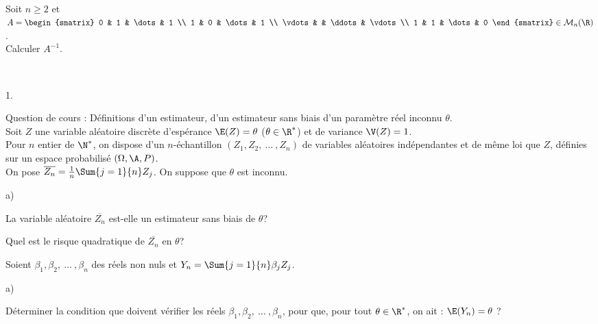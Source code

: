 \documentclass[11pt]{article}%
\begin{document}
\begin{exerciceSP}~\\
  Soit $n \geq 2$ et $A = 
  \begin{smatrix} 
    0 & 1 & \dots & 1 \\ 
    1 & 0 & \dots & 1 \\ 
    \vdots & & \ddots & \vdots \\ 
    1 & 1 & \dots & 0
  \end{smatrix} \in \mathcal{M}_n(\R)$.
  \\[.2cm]
  Calculer $A^{-1}$.
\end{exerciceSP}


\newpage


\begin{exerciceAP}~
  \begin{noliste}{1.}
    \setlength{\itemsep}{2mm}
  \item Question de cours : Définitions d'un estimateur, d'un
    estimateur sans biais d'un paramètre réel inconnu $\theta$.
    \\[.2cm]
    Soit $Z$ une variable aléatoire discrète d'espérance $\E(Z) =
    \theta$ ($\theta \in \R^*$) et de variance $\V(Z) = 1$.
    \\[.2cm]
    Pour $n$ entier de $\N^*$, on dispose d'un $n$-échantillon $(Z_1 ,
    Z_2 ,\ \dots\ , Z_n)$ de variables aléatoires indépendantes et de
    même loi que $Z$, définies sur un espace probabilisé $(\Omega , \A
    , P)$.
    \\[.2cm]
    On pose $\overline{Z_n} = \frac{1}{n} \Sum{j=1}{n} Z_j$. On
    suppose que $\theta$ est inconnu.
  \item \begin{noliste}{a)}
    \setlength{\itemsep}{2mm} \item La variable aléatoire
      $\overline{Z_n}$ est-elle un estimateur sans biais de $\theta$?
    \item Quel est le risque quadratique de $\overline{Z_n}$ en
      $\theta$?
    \end{noliste}
  \item Soient $\beta_1, \beta_2,\ \dots\ , \beta_n$ des réels non
    nuls et $Y_n = \Sum{j=1}{n} \beta_j Z_j$.
    \begin{noliste}{a)}
    \setlength{\itemsep}{2mm}
    \item Déterminer la condition que doivent vérifier les réels
      $\beta_1, \beta_2,\ \dots\ , \beta_n$, pour que, pour tout
      $\theta \in \R^*$, on ait : $\E(Y_n) = \theta$ ?
      \\[.2cm]

\end{noliste}
\end{noliste}
\end{exerciceAP}
\end{document}
